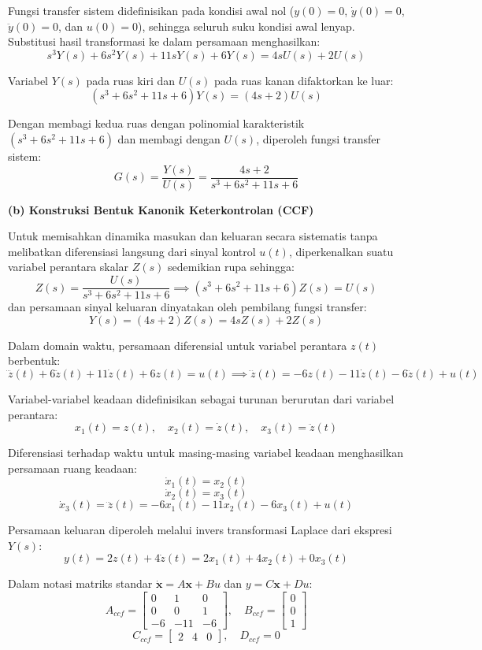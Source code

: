 \documentclass[11pt,a4paper]{article}
\begin{document}
Fungsi transfer sistem didefinisikan pada kondisi awal nol ($y(0) = 0$, $\dot{y}(0) = 0$, $\ddot{y}(0) = 0$, dan $u(0) = 0$), sehingga seluruh suku kondisi awal lenyap. Substitusi hasil transformasi ke dalam persamaan menghasilkan:
$$s^3 Y(s) + 6s^2 Y(s) + 11s Y(s) + 6Y(s) = 4s U(s) + 2U(s)$$

Variabel $Y(s)$ pada ruas kiri dan $U(s)$ pada ruas kanan difaktorkan ke luar:
$$(s^3 + 6s^2 + 11s + 6) Y(s) = (4s + 2) U(s)$$

Dengan membagi kedua ruas dengan polinomial karakteristik $(s^3 + 6s^2 + 11s + 6)$ dan membagi dengan $U(s)$, diperoleh fungsi transfer sistem:
$$G(s) = \frac{Y(s)}{U(s)} = \frac{4s + 2}{s^3 + 6s^2 + 11s + 6}$$

\textbf{(b) Konstruksi Bentuk Kanonik Keterkontrolan (CCF)}

Untuk memisahkan dinamika masukan dan keluaran secara sistematis tanpa melibatkan diferensiasi langsung dari sinyal kontrol $u(t)$, diperkenalkan suatu variabel perantara skalar $Z(s)$ sedemikian rupa sehingga:
$$Z(s) = \frac{U(s)}{s^3 + 6s^2 + 11s + 6} \implies (s^3 + 6s^2 + 11s + 6) Z(s) = U(s)$$
dan persamaan sinyal keluaran dinyatakan oleh pembilang fungsi transfer:
$$Y(s) = (4s + 2) Z(s) = 4s Z(s) + 2 Z(s)$$

Dalam domain waktu, persamaan diferensial untuk variabel perantara $z(t)$ berbentuk:
$$\dddot{z}(t) + 6\ddot{z}(t) + 11\dot{z}(t) + 6z(t) = u(t) \implies \dddot{z}(t) = -6z(t) - 11\dot{z}(t) - 6\ddot{z}(t) + u(t)$$

Variabel-variabel keadaan didefinisikan sebagai turunan berurutan dari variabel perantara:
$$x_1(t) = z(t), \quad x_2(t) = \dot{z}(t), \quad x_3(t) = \ddot{z}(t)$$

Diferensiasi terhadap waktu untuk masing-masing variabel keadaan menghasilkan persamaan ruang keadaan:
$$\dot{x}_1(t) = x_2(t)$$
$$\dot{x}_2(t) = x_3(t)$$
$$\dot{x}_3(t) = \dddot{z}(t) = -6x_1(t) - 11x_2(t) - 6x_3(t) + u(t)$$

Persamaan keluaran diperoleh melalui invers transformasi Laplace dari ekspresi $Y(s)$:
$$y(t) = 2z(t) + 4\dot{z}(t) = 2x_1(t) + 4x_2(t) + 0x_3(t)$$

Dalam notasi matriks standar $\dot{\mathbf{x}} = A\mathbf{x} + B u$ dan $y = C\mathbf{x} + D u$:
$$A_{ccf} = \begin{bmatrix} 0 & 1 & 0 \\ 0 & 0 & 1 \\ -6 & -11 & -6 \end{bmatrix}, \quad B_{ccf} = \begin{bmatrix} 0 \\ 0 \\ 1 \end{bmatrix}$$
$$C_{ccf} = \begin{bmatrix} 2 & 4 & 0 \end{bmatrix}, \quad D_{ccf} = 0$$
\end{document}
